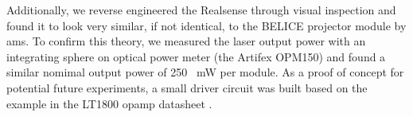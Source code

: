 Additionally, we reverse engineered the Realsense through visual inspection and found it to look very similar, if not identical, to the BELICE projector module by ams. 
To confirm this theory, we measured the laser output power with an integrating sphere on optical power meter (the Artifex OPM150) and found a similar nomimal output power of 250 ~mW per module.
As a proof of concept for potential future experiments, a small driver circuit was built based on the example in the LT1800 opamp datasheet \cite{lt1800}. 